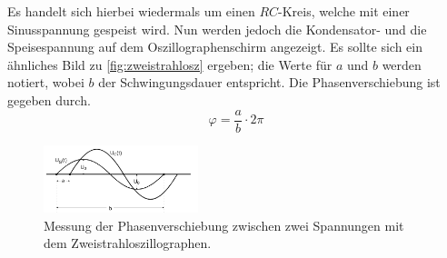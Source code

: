    \noindent Es handelt sich hierbei wiedermals um einen $RC$-Kreis, welche mit einer Sinusspannung gespeist wird. Nun werden jedoch die Kondensator- und die 
    Speisespannung auf dem Oszillographenschirm angezeigt. Es sollte sich ein ähnliches Bild zu \autoref{fig:zweistrahlosz} ergeben; die Werte für $a$ und $b$
    werden notiert, wobei $b$ der Schwingungsdauer entspricht. Die Phasenverschiebung ist gegeben durch.
    \begin{equation*}
        \varphi = \frac{a}{b} \cdot 2 \pi
    \end{equation*}

    \begin{figure}
        \centering
        \includegraphics[width=0.4\textwidth]{bilder/Zweistrahloszillograph.PNG}
        \caption{Messung der Phasenverschiebung zwischen zwei Spannungen mit dem Zweistrahloszillographen.}
        \label{fig:zweistrahlosz}
    \end{figure}